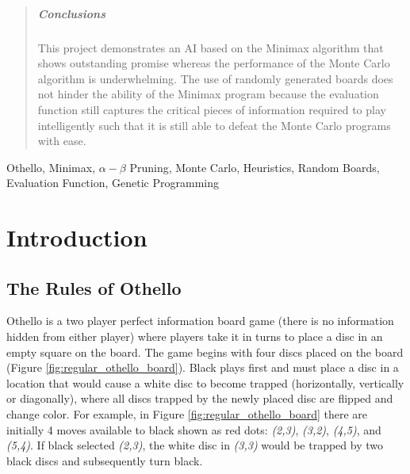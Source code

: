 \documentclass[12pt,a4paper]{article}
\begin{document}
\begin{abstract}
\subparagraph{Conclusions}

This project demonstrates an AI based on the Minimax algorithm that shows outstanding promise whereas the performance of the Monte Carlo algorithm is underwhelming. The use of randomly generated boards does not hinder the ability of the Minimax program because the evaluation function still captures the critical pieces of information required to play intelligently such that it is still able to defeat the Monte Carlo programs with ease.



\end{abstract}

\begin{keywords}
Othello, Minimax, $\alpha-\beta$ Pruning, Monte Carlo, Heuristics, Random Boards, Evaluation Function, Genetic Programming
\end{keywords}


\section{Introduction}

\subsection{The Rules of Othello}

Othello is a two player perfect information board game (there is no information hidden from either player) where players take it in turns to place a disc in an empty square on the board. The game begins with four discs placed on the board (Figure \ref{fig:regular_othello_board}). Black plays first and must place a disc in a location that would cause a white disc to become trapped (horizontally, vertically or diagonally), where all discs trapped by the newly placed disc are flipped and change color. For example, in Figure \ref{fig:regular_othello_board} there are initially 4 moves available to black shown as red dots: \textit{(2,3)},  \textit{(3,2)},  \textit{(4,5)}, and \textit{(5,4)}. If black selected \textit{(2,3)}, the white disc in \textit{(3,3)} would be trapped by two black discs and subsequently turn black.
\end{document}
